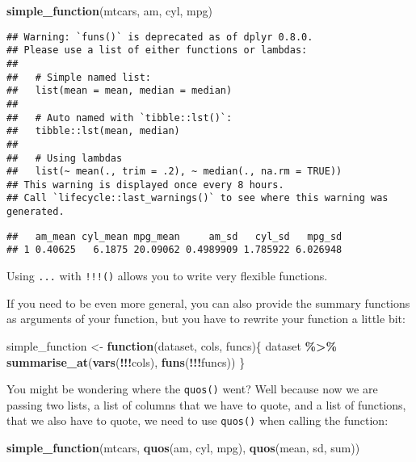 \documentclass[
]{article}
\newenvironment{Shaded}{\begin{snugshade}}{\end{snugshade}}
\newcommand{\ControlFlowTok}[1]{\textcolor[rgb]{0.13,0.29,0.53}{\textbf{#1}}}
\newcommand{\KeywordTok}[1]{\textcolor[rgb]{0.13,0.29,0.53}{\textbf{#1}}}
\newcommand{\NormalTok}[1]{#1}
\newcommand{\OperatorTok}[1]{\textcolor[rgb]{0.81,0.36,0.00}{\textbf{#1}}}
\newcommand{\StringTok}[1]{\textcolor[rgb]{0.31,0.60,0.02}{#1}}
\begin{document}
\begin{Shaded}
\begin{Highlighting}[]
\KeywordTok{simple\_function}\NormalTok{(mtcars, am, cyl, mpg)}
\end{Highlighting}
\end{Shaded}

\begin{verbatim}
## Warning: `funs()` is deprecated as of dplyr 0.8.0.
## Please use a list of either functions or lambdas: 
## 
##   # Simple named list: 
##   list(mean = mean, median = median)
## 
##   # Auto named with `tibble::lst()`: 
##   tibble::lst(mean, median)
## 
##   # Using lambdas
##   list(~ mean(., trim = .2), ~ median(., na.rm = TRUE))
## This warning is displayed once every 8 hours.
## Call `lifecycle::last_warnings()` to see where this warning was generated.
\end{verbatim}

\begin{verbatim}
##   am_mean cyl_mean mpg_mean     am_sd   cyl_sd   mpg_sd
## 1 0.40625   6.1875 20.09062 0.4989909 1.785922 6.026948
\end{verbatim}

Using \texttt{...} with \texttt{!!!()} allows you to write very flexible functions.

If you need to be even more general, you can also provide the summary functions as arguments of
your function, but you have to rewrite your function a little bit:

\begin{Shaded}
\begin{Highlighting}[]
\NormalTok{simple\_function \textless{}{-}}\StringTok{ }\ControlFlowTok{function}\NormalTok{(dataset, cols, funcs)\{}
\NormalTok{  dataset }\OperatorTok{\%\textgreater{}\%}
\StringTok{    }\KeywordTok{summarise\_at}\NormalTok{(}\KeywordTok{vars}\NormalTok{(}\OperatorTok{!!!}\NormalTok{cols), }\KeywordTok{funs}\NormalTok{(}\OperatorTok{!!!}\NormalTok{funcs))}
\NormalTok{\}}
\end{Highlighting}
\end{Shaded}

You might be wondering where the \texttt{quos()} went? Well because now we are passing two lists, a list of
columns that we have to quote, and a list of functions, that we also have to quote, we need to use \texttt{quos()}
when calling the function:

\begin{Shaded}
\begin{Highlighting}[]
\KeywordTok{simple\_function}\NormalTok{(mtcars, }\KeywordTok{quos}\NormalTok{(am, cyl, mpg), }\KeywordTok{quos}\NormalTok{(mean, sd, sum))}
\end{Highlighting}
\end{Shaded}
\end{document}
